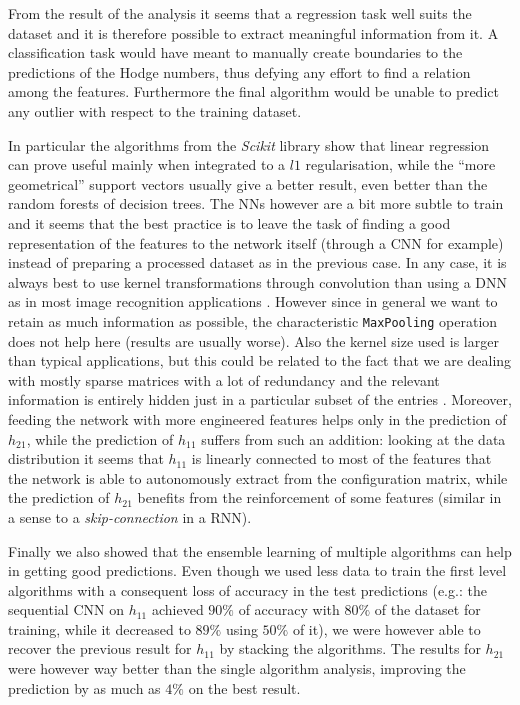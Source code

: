 From the result of the analysis it seems that a regression task well suits the dataset and it is therefore possible to extract meaningful information from it. A classification task would have meant to manually create boundaries to the predictions of the Hodge numbers, thus defying any effort to find a relation among the features. Furthermore the final algorithm would be unable to predict any outlier with respect to the training dataset.

In particular the algorithms from the \textit{Scikit} library show that linear regression can prove useful mainly when integrated to a $l1$ regularisation, while the ``more geometrical'' support vectors usually give a better result, even better than the random forests of decision trees. The NNs however are a bit more subtle to train and it seems that the best practice is to leave the task of finding a good representation of the features to the network itself (through a CNN for example) instead of preparing a processed dataset as in the previous case. In any case, it is always best to use kernel transformations through convolution than using a DNN as in most image recognition applications \cite{NIPS2012_4824}. However since in general we want to retain as much information as possible, the characteristic \texttt{MaxPooling} operation does not help here (results are usually worse). Also the kernel size used is larger than typical applications, but this could be related to the fact that we are dealing with mostly sparse matrices with a lot of redundancy and the relevant information is entirely hidden just in a particular subset of the entries \cite{NIPS2014_5544,jaderberg2014speeding,Liu_2015_CVPR}. Moreover, feeding the network with more engineered features helps only in the prediction of $h_{21}$, while the prediction of $h_{11}$ suffers from such an addition: looking at the data distribution it seems that $h_{11}$ is linearly connected to most of the features that the network is able to autonomously extract from the configuration matrix, while the prediction of $h_{21}$ benefits from the reinforcement of some features (similar in a sense to a \textit{skip-connection} in a RNN).

Finally we also showed that the ensemble learning of multiple algorithms can help in getting good predictions. Even though we used less data to train the first level algorithms with a consequent loss of accuracy in the test predictions (e.g.: the sequential CNN on $h_{11}$ achieved $90\%$ of accuracy with $80\%$ of the dataset for training, while it decreased to $89\%$ using $50\%$ of it), we were however able to recover the previous result for $h_{11}$ by stacking the algorithms. The results for $h_{21}$ were however way better than the single algorithm analysis, improving the prediction by as much as $4\%$ on the best result.

